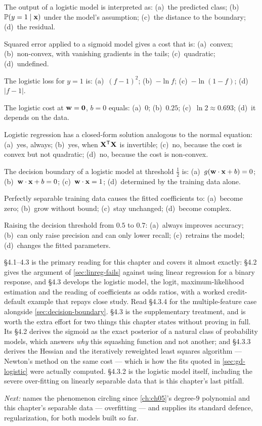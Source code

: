 \qz The output of a logistic model is interpreted as: (a)~the predicted class;
(b)~$\mathbb{P}(y=1\mid\mathbf{x})$ under the model's assumption; (c)~the distance to the
boundary; (d)~the residual.

\qz Squared error applied to a sigmoid model gives a cost that is: (a)~convex;
(b)~non-convex, with vanishing gradients in the tails; (c)~quadratic;
(d)~undefined.

\qz The logistic loss for $y=1$ is: (a)~$(f-1)^2$; (b)~$-\ln f$; (c)~$-\ln(1-f)$;
(d)~$|f-1|$.

\qz The logistic cost at $\mathbf{w} = \mathbf{0}$, $b=0$ equals: (a)~$0$; (b)~$0.25$;
(c)~$\ln 2 \approx 0.693$; (d)~it depends on the data.

\qz Logistic regression has a closed-form solution analogous to the normal
equation: (a)~yes, always; (b)~yes, when $\mathbf{X}^{\mathsf{T}}\mathbf{X}$ is invertible;
(c)~no, because the cost is convex but not quadratic; (d)~no, because the cost
is non-convex.

\qz The decision boundary of a logistic model at threshold $\tfrac12$ is:
(a)~$g(\mathbf{w}\cdot\mathbf{x}+b) = 0$; (b)~$\mathbf{w}\cdot\mathbf{x} + b = 0$; (c)~$\mathbf{w}\cdot\mathbf{x} = 1$;
(d)~determined by the training data alone.

\qz Perfectly separable training data causes the fitted coefficients to:
(a)~become zero; (b)~grow without bound; (c)~stay unchanged; (d)~become complex.

\qz Raising the decision threshold from $0.5$ to $0.7$: (a)~always improves
accuracy; (b)~can only raise precision and can only lower recall;
(c)~retrains the model; (d)~changes the fitted parameters.

\furtherreading

\textcite{james2021} §4.1--4.3 is the primary reading for this chapter and covers
it almost exactly: §4.2 gives the argument of \cref{sec:linreg-fails} against
using linear regression for a binary response, and §4.3 develops the logistic
model, the logit, maximum-likelihood estimation and the reading of coefficients
as odds ratios, with a worked credit-default example that repays close study.
Read §4.3.4 for the multiple-feature case alongside \cref{sec:decision-boundary}.
\textcite{bishop2006} §4.3 is the supplementary treatment, and is worth the extra
effort for two things this chapter states without proving in full. Its §4.2
derives the sigmoid as the exact posterior of a natural class of probability
models, which answers \emph{why} this squashing function and not another; and
§4.3.3 derives the Hessian and the iteratively reweighted least squares
algorithm --- Newton's method on the same cost --- which is how the fits quoted
in \cref{sec:gd-logistic} were actually computed. §4.3.2 is the logistic model
itself, including the severe over-fitting on linearly separable data that is
this chapter's last pitfall.

\bigskip
\noindent\emph{Next:}  names the phenomenon circling since
\cref{ch:ch05}'s degree-$9$ polynomial and this chapter's separable data ---
overfitting --- and supplies its standard defence, regularization, for both
models built so far.
